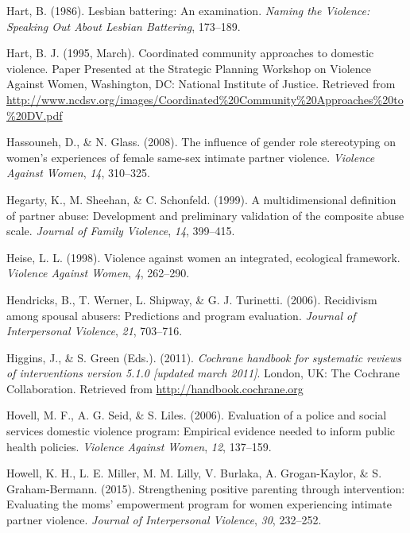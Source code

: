 \documentclass[11pt,]{tufte-book}
\begin{document}
\hypertarget{ref-hart1986lesbian}{}
Hart, B. (1986). Lesbian battering: An examination. \emph{Naming the
Violence: Speaking Out About Lesbian Battering}, 173--189.

\hypertarget{ref-hart1995coordinated}{}
Hart, B. J. (1995, March). Coordinated community approaches to domestic
violence. Paper Presented at the Strategic Planning Workshop on Violence
Against Women, Washington, DC: National Institute of Justice. Retrieved
from
\url{http://www.ncdsv.org/images/Coordinated\%20Community\%20Approaches\%20to\%20DV.pdf}

\hypertarget{ref-hassouneh2008influence}{}
Hassouneh, D., \& N. Glass. (2008). The influence of gender role
stereotyping on women's experiences of female same-sex intimate partner
violence. \emph{Violence Against Women}, \emph{14}, 310--325.

\hypertarget{ref-hegarty1999multidimensional}{}
Hegarty, K., M. Sheehan, \& C. Schonfeld. (1999). A multidimensional
definition of partner abuse: Development and preliminary validation of
the composite abuse scale. \emph{Journal of Family Violence}, \emph{14},
399--415.

\hypertarget{ref-heise1998violence}{}
Heise, L. L. (1998). Violence against women an integrated, ecological
framework. \emph{Violence Against Women}, \emph{4}, 262--290.

\hypertarget{ref-hendricks2006recidivism}{}
Hendricks, B., T. Werner, L. Shipway, \& G. J. Turinetti. (2006).
Recidivism among spousal abusers: Predictions and program evaluation.
\emph{Journal of Interpersonal Violence}, \emph{21}, 703--716.

\hypertarget{ref-higgins2011cochrane}{}
Higgins, J., \& S. Green (Eds.). (2011). \emph{Cochrane handbook for
systematic reviews of interventions version 5.1.0 {[}updated march
2011{]}}. London, UK: The Cochrane Collaboration. Retrieved from
\url{http://handbook.cochrane.org}

\hypertarget{ref-hovell2006evaluation}{}
Hovell, M. F., A. G. Seid, \& S. Liles. (2006). Evaluation of a police
and social services domestic violence program: Empirical evidence needed
to inform public health policies. \emph{Violence Against Women},
\emph{12}, 137--159.

\hypertarget{ref-howell2015strengthening}{}
Howell, K. H., L. E. Miller, M. M. Lilly, V. Burlaka, A. Grogan-Kaylor,
\& S. Graham-Bermann. (2015). Strengthening positive parenting through
intervention: Evaluating the moms' empowerment program for women
experiencing intimate partner violence. \emph{Journal of Interpersonal
Violence}, \emph{30}, 232--252.
\end{document}
